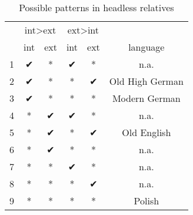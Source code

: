 \begin{table}[H]
  \center
  \caption{Possible patterns in headless relatives}
    \begin{tabular}{ccc|ccc}
    \toprule
      &   \multicolumn{2}{c}{\ac{int}>\ac{ext}}   & \multicolumn{2}{|c}{\ac{ext}>\ac{int}}  &                  \\
          \cmidrule(lr){2-3}                      \cmidrule(lr){4-5}
      &   \ac{int}            & \ac{ext}          & \ac{int}          & \ac{ext}            & language         \\
          \cmidrule(lr){2-2}  \cmidrule(lr){3-3}  \cmidrule(lr){4-4}  \cmidrule(lr){5-5}    \cmidrule(lr){6-6}
    1 &   ✔                   & *                 & ✔               & *                     & n.a.             \\
    2 &   ✔                   & *                 & *               & ✔                     & Old High German  \\
    3 &   ✔                   & *                 & *               & *                     & Modern German    \\
    4 &   {*}                 & ✔                 & ✔               & *                     & n.a.             \\
    5 &   {*}                 & ✔                 & *               & ✔                     & Old English      \\
    6 &   {*}                 & ✔                 & *               & *                     & n.a.             \\
    7 &   {*}                 & *                 & ✔               & *                     & n.a.             \\
    8 &   {*}                 & *                 & *               & ✔                     & n.a.             \\
    9 &   {*}                 & *                 & *               & *                     & Polish           \\
    \bottomrule
  \end{tabular}
    \label{tbl:possible-headless-relatives}
\end{table}

